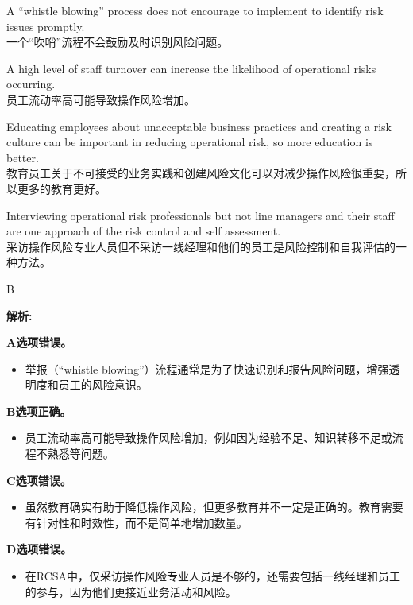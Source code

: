 \documentclass{article}
\newenvironment{explanation}
{\textbf{解析:}\par}
{\par}
\begin{document}
    \begin{choices}
        \item A “whistle blowing” process does not encourage to implement to identify risk issues promptly.\\
        一个“吹哨”流程不会鼓励及时识别风险问题。
        \item A high level of staff turnover can increase the likelihood of operational risks occurring.\\
        员工流动率高可能导致操作风险增加。
        \item Educating employees about unacceptable business practices and creating a risk culture can be important in reducing operational risk, so more education is better.\\
        教育员工关于不可接受的业务实践和创建风险文化可以对减少操作风险很重要，所以更多的教育更好。
        \item Interviewing operational risk professionals but not line managers and their staff are one approach of the risk control and self assessment.\\
        采访操作风险专业人员但不采访一线经理和他们的员工是风险控制和自我评估的一种方法。
    \end{choices}
    
    \begin{correctanswer}
        B
    \end{correctanswer}
    
    \begin{explanation}
        \textbf{A选项错误。}
        \begin{itemize}
            \item 举报（“whistle blowing”）流程通常是为了快速识别和报告风险问题，增强透明度和员工的风险意识。
        \end{itemize}
    
        \textbf{B选项正确。}
        \begin{itemize}
            \item 员工流动率高可能导致操作风险增加，例如因为经验不足、知识转移不足或流程不熟悉等问题。
        \end{itemize}
    
        \textbf{C选项错误。}
        \begin{itemize}
            \item 虽然教育确实有助于降低操作风险，但更多教育并不一定是正确的。教育需要有针对性和时效性，而不是简单地增加数量。
        \end{itemize}
    
        \textbf{D选项错误。}
        \begin{itemize}
            \item 在RCSA中，仅采访操作风险专业人员是不够的，还需要包括一线经理和员工的参与，因为他们更接近业务活动和风险。
        \end{itemize}
    \end{explanation}
\end{document}
